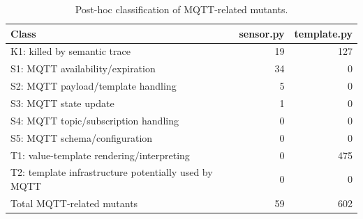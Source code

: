 \begin{table}[!htbp]
\centering
\caption{Post-hoc classification of MQTT-related mutants.}
\label{tab:mutant-classes-summary}
\scriptsize
\setlength{\tabcolsep}{3pt}
\begin{tabular}{>{\raggedright\arraybackslash}p{}rr}
\hline
Class & sensor.py & template.py \\
\hline
K1: killed by semantic trace & 19 & 127 \\
S1: MQTT availability/expiration & 34 & 0 \\
S2: MQTT payload/template handling & 5 & 0 \\
S3: MQTT state update & 1 & 0 \\
S4: MQTT topic/subscription handling & 0 & 0 \\
S5: MQTT schema/configuration & 0 & 0 \\
T1: value-template rendering/interpreting & 0 & 475 \\
T2: template infrastructure potentially used by MQTT & 0 & 0 \\
\hline
Total MQTT-related mutants & 59 & 602 \\
\hline
\end{tabular}
\end{table}
